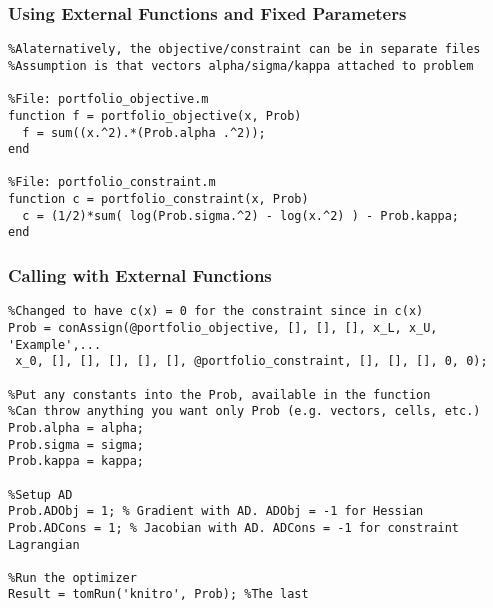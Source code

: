 \documentclass[nofootline]{etk-presentation}
\begin{document}
\begin{frame}[fragile]	\frametitle{Using External Functions and Fixed Parameters}

\begin{verbatim}
%Alaternatively, the objective/constraint can be in separate files
%Assumption is that vectors alpha/sigma/kappa attached to problem

%File: portfolio_objective.m
function f = portfolio_objective(x, Prob)
  f = sum((x.^2).*(Prob.alpha .^2));
end

%File: portfolio_constraint.m
function c = portfolio_constraint(x, Prob)
  c = (1/2)*sum( log(Prob.sigma.^2) - log(x.^2) ) - Prob.kappa;
end
\end{verbatim}	
\end{frame}	

\begin{frame}[fragile]	\frametitle{Calling with External Functions}
\begin{verbatim}
%Changed to have c(x) = 0 for the constraint since in c(x)
Prob = conAssign(@portfolio_objective, [], [], [], x_L, x_U, 'Example',...
 x_0, [], [], [], [], [], @portfolio_constraint, [], [], [], 0, 0);

%Put any constants into the Prob, available in the function
%Can throw anything you want only Prob (e.g. vectors, cells, etc.)
Prob.alpha = alpha;
Prob.sigma = sigma;
Prob.kappa = kappa;

%Setup AD
Prob.ADObj = 1; % Gradient with AD. ADObj = -1 for Hessian
Prob.ADCons = 1; % Jacobian with AD. ADCons = -1 for constraint Lagrangian 

%Run the optimizer
Result = tomRun('knitro', Prob); %The last 	
\end{verbatim}	
\end{frame}	
	
\begin{frame}\frametitle{}
	\bigskip
	\bigskip
	\bigskip	
	\begin{center}
		{\huge {}}
	\end{center}
\end{frame}
\end{document}
